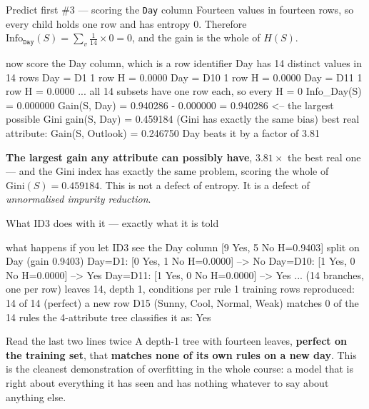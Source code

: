\documentclass[aspectratio=169]{beamer}
\begin{document}
\begin{frame}[fragile,shrink=8]{Predict first \#3 --- scoring the \texttt{Day} column}
Fourteen values in fourteen rows, so every child holds one row and has entropy
$0$. Therefore $\mathrm{Info}_{\texttt{Day}}(S) = \sum_v \tfrac{1}{14}\times 0
= 0$, and the gain is the whole of $H(S)$.
\vspace{0.2em}
\begin{outblk}
now score the Day column, which is a row identifier
Day has 14 distinct values in 14 rows
   Day = D1   1 row   H = 0.0000
   Day = D10  1 row   H = 0.0000
   Day = D11  1 row   H = 0.0000
   ... all 14 subsets have one row each, so every H = 0
Info_Day(S)  = 0.000000
Gain(S, Day) = 0.940286 - 0.000000 = 0.940286   <-- the largest possible
Gini gain(S, Day) = 0.459184   (Gini has exactly the same bias)
best real attribute:  Gain(S, Outlook) = 0.246750
Day beats it by a factor of 3.81
\end{outblk}
\begin{center}\small
  \textbf{The largest gain any attribute can possibly have}, $3.81\times$ the
  best real one --- and the Gini index has exactly the same problem, scoring
  the whole of $\mathrm{Gini}(S) = 0.459184$. This is not a defect of entropy.
  It is a defect of \emph{unnormalised impurity reduction}.
\end{center}
\end{frame}

\begin{frame}[fragile,shrink=8]{What ID3 does with it --- exactly what it is told}
\begin{outblk}
what happens if you let ID3 see the Day column
[9 Yes, 5 No  H=0.9403]  split on Day (gain 0.9403)
   Day=D1: [0 Yes, 1 No  H=0.0000] --> No
   Day=D10: [1 Yes, 0 No  H=0.0000] --> Yes
   Day=D11: [1 Yes, 0 No  H=0.0000] --> Yes
   ... (14 branches, one per row)
leaves 14, depth 1, conditions per rule 1
training rows reproduced: 14 of 14  (perfect)
a new row D15 (Sunny, Cool, Normal, Weak) matches 0 of the 14 rules
the 4-attribute tree classifies it as: Yes
\end{outblk}
\begin{alertblock}{Read the last two lines twice}
  \footnotesize A depth-1 tree with fourteen leaves, \textbf{perfect on the
  training set}, that \textbf{matches none of its own rules on a new day}.
  This is the cleanest demonstration of overfitting in the whole course: a
  model that is right about everything it has seen and has nothing whatever
  to say about anything else.
\end{alertblock}
\end{frame}
\end{document}
